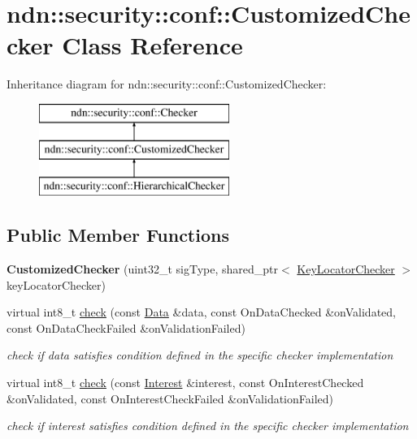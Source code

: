 \hypertarget{classndn_1_1security_1_1conf_1_1CustomizedChecker}{}\section{ndn\+:\+:security\+:\+:conf\+:\+:Customized\+Checker Class Reference}
\label{classndn_1_1security_1_1conf_1_1CustomizedChecker}
Inheritance diagram for ndn\+:\+:security\+:\+:conf\+:\+:Customized\+Checker\+:\begin{figure}[H]
\begin{center}
\leavevmode
\includegraphics[height=3.000000cm]{classndn_1_1security_1_1conf_1_1CustomizedChecker}
\end{center}
\end{figure}
\subsection*{Public Member Functions}
\begin{DoxyCompactItemize}
\item 
{\bfseries Customized\+Checker} (uint32\+\_\+t sig\+Type, shared\+\_\+ptr$<$ \hyperlink{classndn_1_1security_1_1conf_1_1KeyLocatorChecker}{Key\+Locator\+Checker} $>$ key\+Locator\+Checker)\hypertarget{classndn_1_1security_1_1conf_1_1CustomizedChecker_ac47b4d919a76cd38eb78233f48c3fff5}{}\label{classndn_1_1security_1_1conf_1_1CustomizedChecker_ac47b4d919a76cd38eb78233f48c3fff5}

\item 
virtual int8\+\_\+t \hyperlink{classndn_1_1security_1_1conf_1_1CustomizedChecker_a581b8e9d0eee9d3989190ab45e19723c}{check} (const \hyperlink{classndn_1_1Data}{Data} \&data, const On\+Data\+Checked \&on\+Validated, const On\+Data\+Check\+Failed \&on\+Validation\+Failed)
\begin{DoxyCompactList}\small\item\em check if data satisfies condition defined in the specific checker implementation \end{DoxyCompactList}\item 
virtual int8\+\_\+t \hyperlink{classndn_1_1security_1_1conf_1_1CustomizedChecker_ae51fcc1726ee34157817203072a80da9}{check} (const \hyperlink{classndn_1_1Interest}{Interest} \&interest, const On\+Interest\+Checked \&on\+Validated, const On\+Interest\+Check\+Failed \&on\+Validation\+Failed)
\begin{DoxyCompactList}\small\item\em check if interest satisfies condition defined in the specific checker implementation \end{DoxyCompactList}\end{DoxyCompactItemize}
